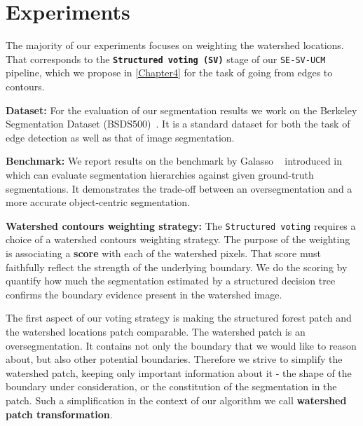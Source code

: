 \chapter{Experiments}
\label{Chapter5}
The majority of our experiments focuses on weighting the watershed locations. That corresponds to the \textbf{\texttt{Structured voting (SV)}} stage of our  {\tt SE-SV-UCM} pipeline, which we propose in \cref{Chapter4} for the task of going from edges to contours.

\textbf{Dataset:} For the evaluation of our segmentation results we work on the Berkeley Segmentation Dataset (BSDS500)~\cite{Arbelaez11}. It is a standard dataset for both the task of edge detection as well as that of image segmentation.

\textbf{Benchmark:} We report results on the benchmark by Galasso \etal~\cite{Galasso13Benchmark} introduced in~\cite{Galasso13} which can evaluate segmentation hierarchies against given ground-truth segmentations. It demonstrates the trade-off between an oversegmentation and a more accurate object-centric segmentation.

\textbf{Watershed contours weighting strategy:} The {\tt Structured voting} requires a choice of a watershed contours weighting strategy. The purpose of the weighting is associating a \textbf{score} with each of the watershed pixels. That score must faithfully reflect the strength of the underlying boundary. 
We do the scoring by quantify how much the segmentation estimated by a structured decision tree confirms the boundary evidence present in the watershed image.

The first aspect of our voting strategy is making the structured forest patch and the watershed locations patch comparable. 
The watershed patch is an oversegmentation. It contains not only the boundary that we would like to reason about, but also other potential boundaries. 
Therefore we strive to simplify the watershed patch, keeping only important information about it - the shape of the boundary under consideration, or the constitution of the segmentation in the patch. Such a simplification in the context of our algorithm we call {\bf watershed patch transformation}. %

